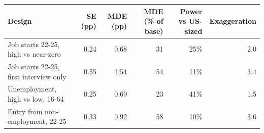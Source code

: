 \begin{tabular}{lrrrrr}
\toprule
Design & SE (pp) & MDE (pp) & MDE (\% of base) & Power vs US-sized & Exaggeration \\
\midrule
Job starts 22-25, high vs near-zero & 0.24 & 0.68 & 31 & 25\% & 2.0 \\
Job starts 22-25, first interview only & 0.55 & 1.54 & 54 & 11\% & 3.4 \\
Unemployment, high vs low, 16-64 & 0.25 & 0.69 & 23 & 41\% & 1.5 \\
Entry from non-employment, 22-25 & 0.33 & 0.92 & 58 & 10\% & 3.6 \\
\bottomrule
\end{tabular}
